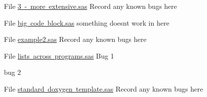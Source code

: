 
\begin{DoxyRefList}
\item[File \mbox{\hyperlink{3_01-_01more_01extensive_8sas}{3 -\/ more extensive.sas}} ]\label{bug__bug000001}%
%
Record any known bugs here  
\item[File \mbox{\hyperlink{big_01code_01block_8sas}{big code block.sas}} ]\label{bug__bug000002}%
%
something doesn\textquotesingle{}t work in here  
\item[File \mbox{\hyperlink{example2_8sas}{example2.sas}} ]\label{bug__bug000003}%
%
Record any known bugs here 


\item[File \mbox{\hyperlink{lists_01across_01programs_8sas}{lists across programs.sas}} ]\label{bug__bug000004}%
%
Bug 1 



bug 2 
\item[File \mbox{\hyperlink{standard_01doxygen_01template_8sas}{standard doxygen template.sas}} ]\label{bug__bug000005}%
%
Record any known bugs here 


\end{DoxyRefList}